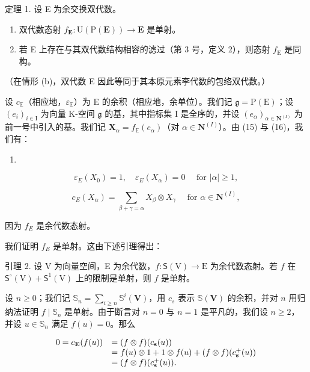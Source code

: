定理 1. 设 E 为余交换双代数。

\begin{enumerate}
\def\labelenumi{(\alph{enumi})}
\item
  双代数态射 \(f_{\mathbf{E}} \colon \mathrm{U}(\mathrm{P}(\mathbf{E})) \to \mathbf{E}\) 是单射。
\item
  若 E 上存在与其双代数结构相容的滤过（第 3 号，定义 2），则态射 \(f_{\mathrm{E}}\) 是同构。
\end{enumerate}

（在情形 (b)，双代数 E 因此等同于其本原元素李代数的包络双代数。）

设 \(c_{\mathbb{E}}\)（相应地，\(\varepsilon_{\mathbb{E}}\)）为 E 的余积（相应地，余单位）。我们记 \(\mathfrak{g} = \mathrm{P}(\mathrm{E})\)；设 \((e_i)_{i \in \mathrm{I}}\) 为向量 K-空间 \(\mathfrak{g}\) 的基，其中指标集 I 是全序的，并设 \((e_\alpha)_{\alpha \in \mathbf{N}^{(I)}}\) 为前一号中引入的基。我们记 \(\mathbf{X}_\alpha = f_{\mathbb{E}}(e_\alpha)\)（对 \(\alpha \in \mathbf{N}^{(I)}\)）。由 (15) 与 (16)，我们有：

\begin{enumerate}
\def\labelenumi{(\arabic{enumi})}
\setcounter{enumi}{16}
\tightlist
\item
\end{enumerate}

\[
\varepsilon_ {E} (X _ {0}) = 1, \quad \varepsilon_ {E} (X _ {\alpha}) = 0 \quad \text { for } | \alpha | \geqslant 1,\tag{18}
\]

\[
c _ {E} (X _ {\alpha}) = \sum_ {\beta + \gamma = \alpha} X _ {\beta} \otimes X _ {\gamma} \quad \text { for } \alpha \in \mathbf {N} ^ {(I)},
\]

因为 \(f_{E}\) 是余代数态射。

我们证明 \(f_{E}\) 是单射。这由下述引理得出：

引理 2. 设 V 为向量空间，E 为余代数，\(f\colon\mathsf{S}(\mathrm{V})\to\mathrm{E}\) 为余代数态射。若 \(f\) 在 \(\mathsf{S}^{\circ}(\mathrm{V})+\mathsf{S}^{1}(\mathrm{V})\) 上的限制是单射，则 \(f\) 是单射。

设 \(n \geqslant 0\)；我们记 \(\mathbb{S}_n = \sum_{i \geqslant n} \mathbb{S}^i(\mathbf{V})\)，用 \(c_s\) 表示 \(\mathbb{S}(\mathbf{V})\) 的余积，并对 \(n\) 用归纳法证明 \(f \mid \mathbb{S}_n\) 是单射。由于断言对 \(n = 0\) 与 \(n = 1\) 是平凡的，我们设 \(n \geqslant 2\)，并设 \(u \in \mathbb{S}_n\) 满足 \(f(u) = 0\)。那么

\[
\begin{array}{r l} {0 = c _ {\mathbf {E}} (f (u))} & {= (f \otimes f) (c _ {\mathbf {s}} (u))} \\ & {= f (u) \otimes 1 + 1 \otimes f (u) + (f \otimes f) (c _ {\mathbf {s}} ^ {+} (u))} \\ & {= (f \otimes f) (c _ {\mathbf {s}} ^ {+} (u)).} \end{array}
\]

